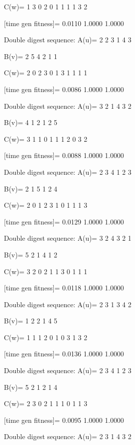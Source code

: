 C(w)=
     1     3     0     2     0     1     1     1     1     3     2

[time gen fitness]=
    0.0110    1.0000    1.0000

Double digest sequence:
A(u)=
     2     2     3     1     4     3

B(v)=
     2     5     4     2     1     1

C(w)=
     2     0     2     3     0     1     3     1     1     1     1

[time gen fitness]=
    0.0086    1.0000    1.0000

Double digest sequence:
A(u)=
     3     2     1     4     3     2

B(v)=
     4     1     2     1     2     5

C(w)=
     3     1     1     0     1     1     1     2     0     3     2

[time gen fitness]=
    0.0088    1.0000    1.0000

Double digest sequence:
A(u)=
     2     3     4     1     2     3

B(v)=
     2     1     5     1     2     4

C(w)=
     2     0     1     2     3     1     0     1     1     1     3

[time gen fitness]=
    0.0129    1.0000    1.0000

Double digest sequence:
A(u)=
     3     2     4     3     2     1

B(v)=
     5     2     1     4     1     2

C(w)=
     3     2     0     2     1     1     3     0     1     1     1

[time gen fitness]=
    0.0118    1.0000    1.0000

Double digest sequence:
A(u)=
     2     3     1     3     4     2

B(v)=
     1     2     2     1     4     5

C(w)=
     1     1     1     2     0     1     0     3     1     3     2

[time gen fitness]=
    0.0136    1.0000    1.0000

Double digest sequence:
A(u)=
     2     3     4     1     2     3

B(v)=
     5     2     1     2     1     4

C(w)=
     2     3     0     2     1     1     1     0     1     1     3

[time gen fitness]=
    0.0095    1.0000    1.0000

Double digest sequence:
A(u)=
     2     3     1     4     3     2

